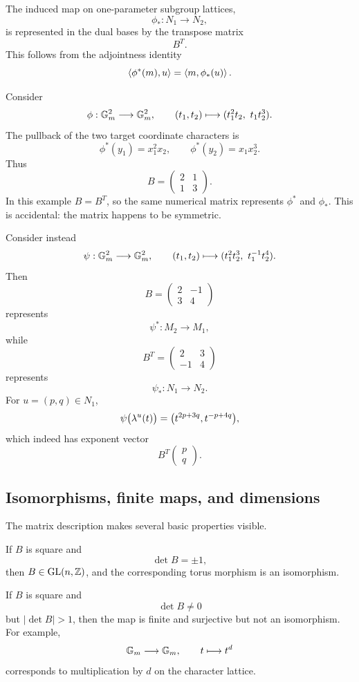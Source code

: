 The induced map on one-parameter subgroup lattices,
\[
\phi_*:N_1\longrightarrow N_2,
\]
is represented in the dual bases by the transpose matrix
\[
B^T.
\]
This follows from the adjointness identity
\[
\left\langle \phi^*(m),u\right\rangle
=
\left\langle m,\phi_*(u)\right\rangle.
\]

\begin{example}
Consider
\[
\phi:\mathbb{G}_{m}^2\longrightarrow\mathbb{G}_{m}^2,
\qquad
(t_1,t_2)
\longmapsto
(t_1^2t_2,\ t_1t_2^3).
\]
The pullback of the two target coordinate characters is
\[
\phi^*(y_1)=x_1^2x_2,
\qquad
\phi^*(y_2)=x_1x_2^3.
\]
Thus
\[
B=
\begin{pmatrix}
2&1\\
1&3
\end{pmatrix}.
\]
In this example \(B=B^T\), so the same numerical matrix represents
\(\phi^*\) and \(\phi_*\). This is accidental: the matrix happens to
be symmetric.
\end{example}

\begin{example}
Consider instead
\[
\psi:\mathbb{G}_{m}^2\longrightarrow\mathbb{G}_{m}^2,
\qquad
(t_1,t_2)
\longmapsto
(t_1^2t_2^3,\ t_1^{-1}t_2^4).
\]
Then
\[
B=
\begin{pmatrix}
2&-1\\
3&4
\end{pmatrix}
\]
represents
\[
\psi^*:M_2\longrightarrow M_1,
\]
while
\[
B^T=
\begin{pmatrix}
2&3\\
-1&4
\end{pmatrix}
\]
represents
\[
\psi_*:N_1\longrightarrow N_2.
\]
For \(u=(p,q)\in N_1\),
\[
\psi\bigl(\lambda^{u}(t)\bigr)
=
\bigl(t^{2p+3q},t^{-p+4q}\bigr),
\]
which indeed has exponent vector
\[
B^T
\begin{pmatrix}
p\\q
\end{pmatrix}.
\]
\end{example}

\subsection{Isomorphisms, finite maps, and dimensions}

The matrix description makes several basic properties visible.

If \(B\) is square and
\[
\det B=\pm1,
\]
then \(B\in\operatorname{GL}(n,\mathbb{Z})\), and the corresponding torus
morphism is an isomorphism.

If \(B\) is square and
\[
\det B\neq0
\]
but \(|\det B|>1\), then the map is finite and surjective but not an
isomorphism. For example,
\[
\mathbb{G}_{m}\longrightarrow\mathbb{G}_{m},
\qquad
t\longmapsto t^d
\]
corresponds to multiplication by \(d\) on the character lattice.

